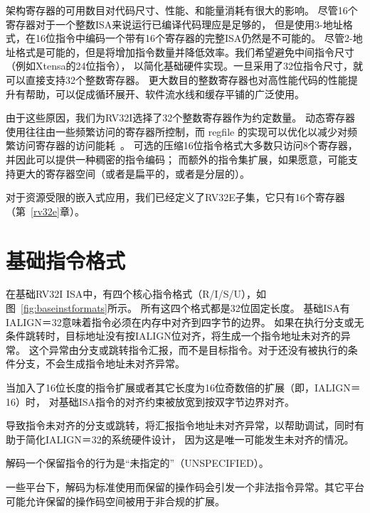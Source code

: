 \begin{commentary}

  架构寄存器的可用数目对代码尺寸、性能、和能量消耗有很大的影响。
  尽管16个寄存器对于一个整数ISA来说运行已编译代码理应是足够的，
  但是使用3-地址格式，在16位指令中编码一个带有16个寄存器的完整ISA仍然是不可能的。
  尽管2-地址格式是可能的，但是将增加指令数量并降低效率。我们希望避免中间指令尺寸（例如Xtensa的24位指令），
  以简化基础硬件实现。一旦采用了32位指令尺寸，就可以直接支持32个整数寄存器。
  更大数目的整数寄存器也对高性能代码的性能提升有帮助，可以促成循环展开、软件流水线和缓存平铺的广泛使用。

  由于这些原因，我们为RV32I选择了32个整数寄存器作为约定数量。
  动态寄存器使用往往由一些频繁访问的寄存器所控制，而 regfile 的实现可以优化以减少对频繁访问寄存器的访问能耗~\cite{jtseng:sbbci}。
  可选的压缩16位指令格式大多数只访问8个寄存器，并因此可以提供一种稠密的指令编码；
  而额外的指令集扩展，如果愿意，可能支持更大的寄存器空间（或者是扁平的，或者是分层的）。

  对于资源受限的嵌入式应用，我们已经定义了RV32E子集，它只有16个寄存器（第~\ref{rv32e}章）。
\end{commentary}

\section{基础指令格式}

在基础RV32I ISA中，有四个核心指令格式（R/I/S/U），如图~\ref{fig:baseinstformats}所示。
所有这四个格式都是32位固定长度。
基础ISA有IALIGN＝32意味着指令必须在内存中对齐到四字节的边界。
如果在执行分支或无条件跳转时，目标地址没有按IALIGN位对齐，将生成一个指令地址未对齐的异常。
这个异常由分支或跳转指令汇报，而不是目标指令。对于还没有被执行的条件分支，不会生成指令地址未对齐异常。

\begin{commentary}

  当加入了16位长度的指令扩展或者其它长度为16位奇数倍的扩展（即，IALIGN＝16）时，
  对基础ISA指令的对齐约束被放宽到按双字节边界对齐。

  导致指令未对齐的分支或跳转，将汇报指令地址未对齐异常，以帮助调试，同时有助于简化IALIGN＝32的系统硬件设计，
  因为这是唯一可能发生未对齐的情况。
\end{commentary}

解码一个保留指令的行为是“未指定的”（UNSPECIFIED）。

\begin{commentary}
  
  一些平台下，解码为标准使用而保留的操作码会引发一个非法指令异常。其它平台可能允许保留的操作码空间被用于非合规的扩展。
\end{commentary}

